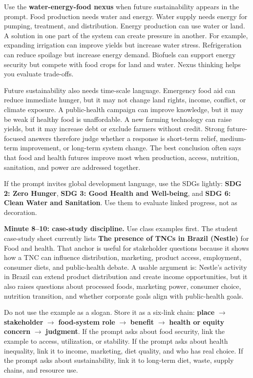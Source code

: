\documentclass[11pt,a4paper]{article}
\newcommand{\term}[1]{\textcolor{HeadingBlue}{\textbf{#1}}}
\begin{document}
Use the \term{water-energy-food nexus} when future sustainability appears in
the prompt. Food production needs water and energy. Water supply needs energy
for pumping, treatment, and distribution. Energy production can use water or
land. A solution in one part of the system can create pressure in another.
For example, expanding irrigation can improve yields but increase water stress.
Refrigeration can reduce spoilage but increase energy demand. Biofuels can
support energy security but compete with food crops for land and water. Nexus
thinking helps you evaluate trade-offs.

Future sustainability also needs time-scale language. Emergency food aid can
reduce immediate hunger, but it may not change land rights, income, conflict,
or climate exposure. A public-health campaign can improve knowledge, but it
may be weak if healthy food is unaffordable. A new farming technology can raise
yields, but it may increase debt or exclude farmers without credit. Strong
future-focused answers therefore judge whether a response is short-term relief,
medium-term improvement, or long-term system change. The best conclusion often
says that food and health futures improve most when production, access,
nutrition, sanitation, and power are addressed together.

If the prompt invites global development language, use the SDGs lightly:
\term{SDG 2: Zero Hunger}, \term{SDG 3: Good Health and Well-being}, and
\term{SDG 6: Clean Water and Sanitation}. Use them to evaluate linked progress,
not as decoration.

\textbf{Minute 8--10: case-study discipline.}
Use class examples first. The student case-study sheet currently lists
\term{The presence of TNCs in Brazil (Nestle)} for Food and health. That anchor
is useful for stakeholder questions because it shows how a TNC can influence
distribution, marketing, product access, employment, consumer diets, and
public-health debate. A usable argument is: Nestle's activity in Brazil can
extend product distribution and create income opportunities, but it also raises
questions about processed foods, marketing power, consumer choice, nutrition
transition, and whether corporate goals align with public-health goals.

Do not use the example as a slogan. Store it as a six-link chain:
\term{place} $\rightarrow$ \term{stakeholder} $\rightarrow$ \term{food-system
role} $\rightarrow$ \term{benefit} $\rightarrow$ \term{health or equity
concern} $\rightarrow$ \term{judgment}. If the prompt asks about food security,
link the example to access, utilization, or stability. If the prompt asks about
health inequality, link it to income, marketing, diet quality, and who has real
choice. If the prompt asks about sustainability, link it to long-term diet,
waste, supply chains, and resource use.
\end{document}
